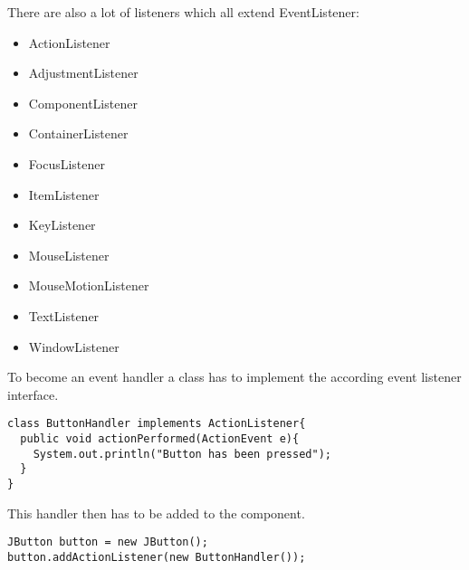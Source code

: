 \documentclass[10pt,landscape]{article}
\begin{document}
\begin{multicols}{3}
There are also a lot of listeners which all extend EventListener:
\begin{itemize}
\item ActionListener
\item AdjustmentListener
\item ComponentListener
\item ContainerListener
\item FocusListener
\item ItemListener
\item KeyListener
\item MouseListener
\item MouseMotionListener
\item TextListener
\item WindowListener
\end{itemize}

To become an event handler a class has to implement the according event listener interface.
\begin{lstlisting}
class ButtonHandler implements ActionListener{
  public void actionPerformed(ActionEvent e){
    System.out.println("Button has been pressed");
  }
}
\end{lstlisting}

This handler then has to be added to the component.
\begin{lstlisting}
JButton button = new JButton();
button.addActionListener(new ButtonHandler());
\end{lstlisting}

\end{multicols}
\end{document}
